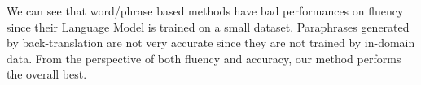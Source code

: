 We can see that word/phrase based methods have bad performances on fluency since their Language Model is trained on a small dataset. Paraphrases generated by back-translation are not very accurate since they are not trained by in-domain data. From the perspective of both fluency and accuracy, our method performs 
the overall best.
